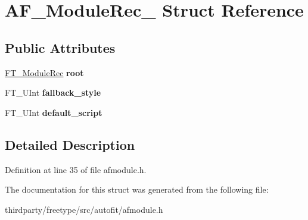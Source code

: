 \hypertarget{struct_a_f___module_rec__}{}\section{A\+F\+\_\+\+Module\+Rec\+\_\+ Struct Reference}
\label{struct_a_f___module_rec__}
\subsection*{Public Attributes}
\begin{DoxyCompactItemize}
\item 
\mbox{\label{struct_a_f___module_rec___a8e8fd4738d1c42e0610fac336bbc6d73}} 
\hyperlink{struct_f_t___module_rec__}{F\+T\+\_\+\+Module\+Rec} {\bfseries root}
\item 
\mbox{\label{struct_a_f___module_rec___a6960fca0f50a7d1ff28cb17d2be8aa66}} 
F\+T\+\_\+\+U\+Int {\bfseries fallback\+\_\+style}
\item 
\mbox{\label{struct_a_f___module_rec___a49c8dee7a9ef1ccd9f608028efab3ddc}} 
F\+T\+\_\+\+U\+Int {\bfseries default\+\_\+script}
\end{DoxyCompactItemize}


\subsection{Detailed Description}


Definition at line 35 of file afmodule.\+h.



The documentation for this struct was generated from the following file\+:\begin{DoxyCompactItemize}
\item 
thirdparty/freetype/src/autofit/afmodule.\+h\end{DoxyCompactItemize}
